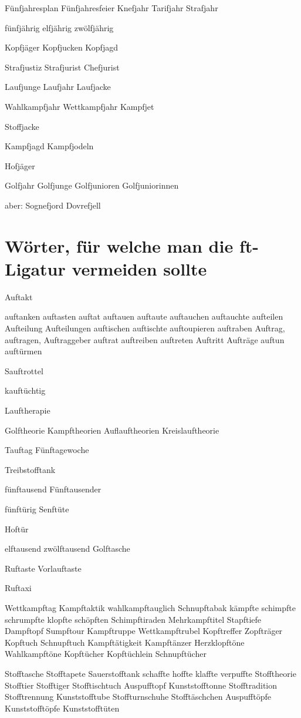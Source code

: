 Fünfjahresplan Fünfjahresfeier Knefjahr Tarifjahr Strafjahr

fünfjährig elfjährig zwölfjährig 

Kopfjäger Kopfjucken Kopfjagd

Strafjustiz Strafjurist Chefjurist

Laufjunge Laufjahr Laufjacke 

Wahlkampfjahr Wettkampfjahr Kampfjet

Stoffjacke

Kampfjagd Kampfjodeln

Hofjäger

Golfjahr Golfjunge Golfjunioren Golfjuniorinnen

aber: Sognefjord Dovrefjell

\egroup


\section*{Wörter, für welche man die ft-Ligatur vermeiden sollte}

Auftakt

auftanken auftasten auftat
auftauen auftaute
auftauchen auftauchte
aufteilen Aufteilung Aufteilungen
auftischen auftischte auftoupieren
auftraben
Auftrag, auftragen, Auftraggeber
auftrat
auftreiben
auftreten
Auftritt
Aufträge
auftun auftürmen 

Sauftrottel

kauftüchtig

Lauftherapie 

Golftheorie Kampftheorien Auflauftheorien Kreislauftheorie

Tauftag Fünftagewoche

Treibstofftank

fünftausend Fünftausender

fünftürig Senftüte

Hoftür

elftausend zwölftausend Golftasche

Ruftaste Vorlauftaste

Ruftaxi

Wettkampftag Kampftaktik 
wahlkampftauglich Schnupftabak
kämpfte schimpfte schrumpfte
klopfte schöpften
Schimpftiraden Mehrkampftitel Stapftiefe
Dampftopf Sumpftour
Kampftruppe Wettkampftrubel
Kopftreffer Zopfträger
Kopftuch Schnupftuch
Kampftätigkeit Kampftänzer
Herzklopftöne Wahlkampftöne
Kopftücher Kopftüchlein Schnupftücher

Stofftasche Stofftapete Sauerstofftank
schaffte hoffte klaffte verpuffte
Stofftheorie
Stofftier Stofftiger Stofftischtuch
Auspufftopf Kunststofftonne
Stofftradition Stofftrennung
Kunststofftube Stoffturnschuhe
Stofftäschchen
Auspufftöpfe Kunststofftöpfe
Kunststofftüten


